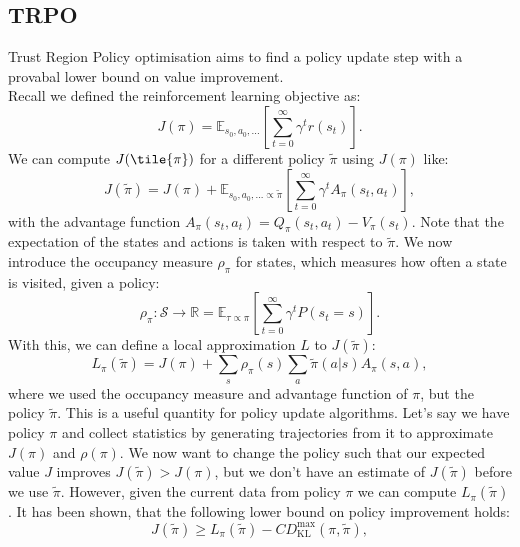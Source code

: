 \subsection{TRPO}
\label{sec:TQC}
Trust Region Policy optimisation \cite{TRPO} aims to find a policy update step with a provabal lower bound on value improvement.\\ 
Recall we defined the reinforcement learning objective as:
\begin{equation}
    J(\pi) = \mathbb{E}_{s_0, a_0, ...}\left[\sum_{t=0}^{\infty}  \gamma^t r(s_t) \right].
\end{equation}
We can compute $J(\tile{\pi})$ for a different policy $\tilde{\pi}$ using $J(\pi)$ like:
\begin{equation}
    J(\tilde{\pi}) = J(\pi) + \mathbb{E}_{s_0, a_0, ... \propto \tilde{\pi}}\left[ \sum_{t=0}^{\infty}  \gamma^t A_{\pi}(s_t, a_t)\right],
\end{equation}
with the advantage function $A_{\pi}(s_t, a_t) = Q_{\pi}(s_t,a_t) - V_{\pi}(s_t)$. Note that the expectation of the states and actions is taken with respect to 
$\tilde{\pi}$. 
We now introduce the occupancy measure $\rho_{\pi}$ for states, which measures how often a state is visited, given a policy:
\begin{equation*}
    \rho_{\pi}:\mathcal{S} \rightarrow \mathbb{R} = \mathbb{E}_{\tau \propto \pi} \left[ \sum_{t=0}^\infty \gamma^t P(s_t=s) \right].
\end{equation*}
With this, we can define a local approximation $L$ to $J(\tilde{\pi})$:
\begin{equation}
    L_{\pi}(\tilde{\pi}) = J(\pi) + \sum_s \rho_{\pi}(s) \sum_a \tilde{\pi}(a|s) A_{\pi}(s,a),
\end{equation}
where we used the occupancy measure and advantage function of $\pi$, but the policy $\tilde{\pi}$. This is a useful quantity for policy update algorithms. 
Let's say we have policy $\pi$ and collect statistics by generating trajectories from it to approximate $J(\pi)$ and $\rho(\pi)$. We now want to change the policy 
such that our expected value $J$ improves $J(\tilde{\pi}) > J(\pi)$, but we don't have an estimate of $J(\tilde{\pi})$ before we use $\tilde{\pi}$. 
However, given the current data from policy $\pi$ we can compute $L_{\pi}(\tilde{\pi})$. It has been shown, that the following lower bound on policy 
improvement holds:
\begin{equation*}
    J(\tilde{\pi}) \geq L_{\pi}(\tilde{\pi}) - C D^{\max}_{\operatorname{KL}} (\pi,\tilde{\pi}),
\end{equation*}
